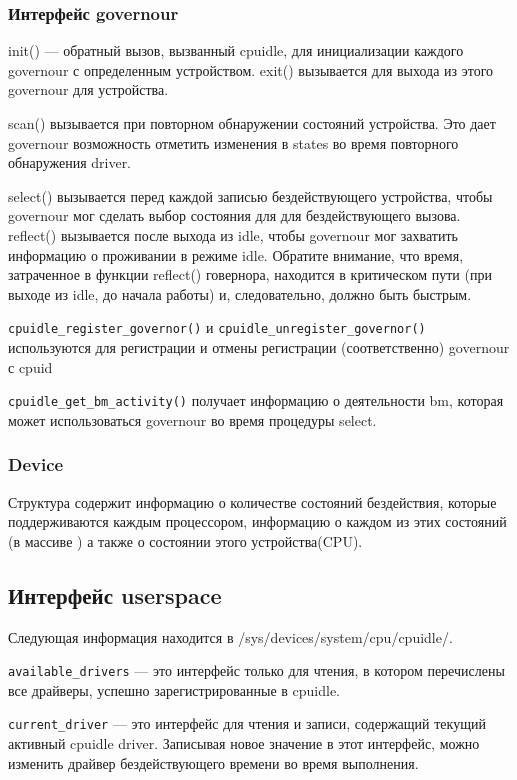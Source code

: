 \documentclass{article}
\begin{document}
\subsubsection{Интерфейс governour}


init() — обратный вызов, вызванный cpuidle, для инициализации каждого governour с определенным устройством. exit() вызывается для выхода из этого governour для устройства.

scan() вызывается при повторном обнаружении состояний устройства. Это дает governour возможность отметить изменения в states во время повторного обнаружения driver.

select() вызывается перед каждой записью бездействующего устройства, чтобы governour мог сделать выбор состояния для для бездействующего вызова. reflect() вызывается после выхода из idle, чтобы governour мог захватить информацию о проживании в режиме idle. Обратите внимание, что время, затраченное в функции reflect() говернора, находится в критическом пути (при выходе из idle, до начала работы) и, следовательно, должно быть быстрым.

\texttt{cpuidle\_register\_governor()}  и \texttt{cpuidle\_unregister\_governor()} используются для регистрации и отмены регистрации (соответственно) governour с cpuid

\texttt{cpuidle\_get\_bm\_activity()} получает информацию о деятельности bm, которая может использоваться governour во время процедуры select.

\subsubsection{Device}
Структура содержит информацию о количестве состояний бездействия, которые поддерживаются каждым процессором, информацию о каждом из этих состояний (в массиве ) а также о состоянии этого устройства(CPU).


\subsection{Интерфейс userspace}

Следующая информация находится в /sys/devices/system/cpu/cpuidle/.

\texttt{available\_drivers} — это интерфейс только для чтения, в котором перечислены все драйверы, успешно зарегистрированные в cpuidle.

\texttt{current\_driver} — это интерфейс для чтения и записи, содержащий текущий активный cpuidle driver. Записывая новое значение в этот интерфейс, можно изменить драйвер бездействующего времени во время выполнения.
\end{document}
